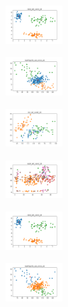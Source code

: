 \begin{figure}[H]
\begin{subfigure}
        \centering
        \includegraphics[width=0.234\textwidth]{img/copkm2/rand_set_const_20_277451237_clust.png}
    \end{subfigure}
    \hfill
    \begin{subfigure}
        \centering
        \includegraphics[width=0.234\textwidth]{img/copkm2/newthyroid_set_const_20_277451237_clust.png}
    \end{subfigure}
    \hfill
    \begin{subfigure}
        \centering
        \includegraphics[width=0.234\textwidth]{img/copkm2/iris_set_const_20_49258669_clust.png}
    \end{subfigure}
    \hfill
    \begin{subfigure}
        \centering
        \includegraphics[width=0.234\textwidth]{img/copkm2/ecoli_set_const_20_49258669_clust.png}
    \end{subfigure}
    \hfill
    \begin{subfigure}
        \centering
        \includegraphics[width=0.234\textwidth]{img/copkm2/rand_set_const_20_49258669_clust.png}
    \end{subfigure}
    \hfill
    \begin{subfigure}
        \centering
        \includegraphics[width=0.234\textwidth]{img/copkm2/newthyroid_set_const_20_49258669_clust.png}

\end{subfigure}
\end{figure}
